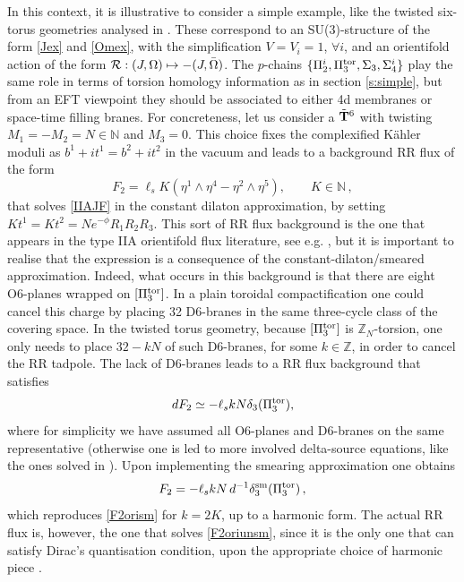 \documentclass[11pt]{article}
\def\be{\begin{equation}}
\def\ee{\end{equation}}
\def\Om{\Omega}
\newcommand{\IZ}{\mathbb{Z}}
\begin{document}
In this context, it is illustrative to consider a simple example, like the twisted six-torus geometries analysed in \cite{Marchesano:2006ns}. These correspond to an SU(3)-structure of the form \eqref{Jex} and \eqref{Omex}, with the simplification $V= V_i =1$, $\forall i$, and an orientifold action of the form ${\cal R}: (J,\Om) \mapsto {-}(J,\bar{\Om})$. The $p$-chains $\{\Pi_2^i, \Pi_3^{\rm tor}, \Sigma_3 , \Sigma_4^i \}$ play the same role in terms of torsion homology information as in section \ref{s:simple}, but from an EFT viewpoint they should be associated to either 4d membranes or space-time filling branes. For concreteness, let us consider a $\tilde{\bf T}^6$ with twisting $M_1 = -M_2 = N \in \mathbb{N}$ and $M_3=0$. This choice fixes the complexified K\"ahler moduli as $b^1+it^1 = b^2+it^2$ in the vacuum and leads to a background RR flux of the form
\be
F_2 = \ell_s K \left(\eta^1 \wedge \eta^4 -\eta^2 \wedge \eta^5\right) , \qquad K \in \mathbb{N}\, ,
\label{F2orism}
\ee
that solves \eqref{IIAJF} in the constant dilaton approximation, by setting $K t^1 = K t^2 = N e^{-\phi}R_1R_2R_3$. This sort of RR flux background is the one that appears in the type IIA orientifold flux literature, see e.g. \cite{Villadoro:2005cu,Camara:2005dc}, but it is important to realise that the expression is a consequence of the constant-dilaton/smeared approximation. Indeed, what occurs in this background is that there are eight O6-planes wrapped on $[\Pi_3^{\rm tor}]$. In a plain toroidal compactification one could cancel this charge by placing 32 D6-branes in the same three-cycle class of the covering space. In the twisted torus geometry, because $[\Pi_3^{\rm tor}]$ is $\IZ_N$-torsion, one only needs to place $32 - kN$ of such D6-branes, for some $k \in \IZ$, in order  to cancel the RR tadpole. The lack of D6-branes leads to a RR flux background that satisfies
\be
dF_2 \simeq -\ell_s k N \delta_3 (\Pi_3^{\rm tor}) ,
\label{F2oriunsm}
\ee
where for simplicity we have assumed all O6-planes and D6-branes on the same representative (otherwise one is led to more involved delta-source equations, like the ones solved in \cite{Casas:2022mnz}). Upon implementing the smearing approximation one obtains
\be
F_2 = - \ell_s k N\, d^{-1}\delta_3^{\rm sm} (\Pi_3^{\rm tor}) \, ,
\ee
which reproduces \eqref{F2orism} for $k =2K$, up to a harmonic form. The actual RR flux is, however, the one that solves \eqref{F2oriunsm}, since it is the only one that can satisfy Dirac's quantisation condition, upon the appropriate choice of harmonic piece \cite{Marchesano:2014iea}. 
\end{document}
